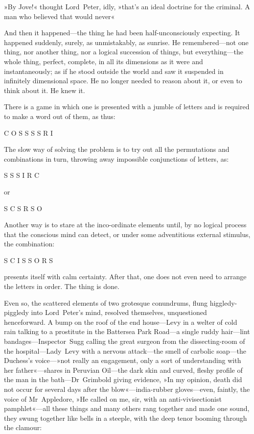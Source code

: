 »By Jove!« thought Lord~Peter, idly, »that's an ideal doctrine for the criminal. A man who believed that would never\longdash«

And then it happened—the thing he had been half-unconsciously expecting. It happened suddenly, surely, as unmistakably, as sunrise. He remembered—not one thing, nor another thing, nor a logical succession of things, but everything—the whole thing, perfect, complete, in all its dimensions as it were and instantaneously; as if he stood outside the world and saw it suspended in infinitely dimensional space. He no longer needed to reason about it, or even to think about it. He knew it.

There is a game in which one is presented with a jumble of letters and is required to make a word out of them, as thus:

\begin{center}
\textsc{C O S S S S R I}
\end{center}

The slow way of solving the problem is to try out all the permutations and combinations in turn, throwing away impossible conjunctions of letters, as:

\begin{center}
\textsc{S S S I R C}
\end{center}

or

\begin{center}
\textsc{S C S R S O}
\end{center}

Another way is to stare at the inco-ordinate elements until, by no logical process that the conscious mind can detect, or under some adventitious external stimulus, the combination:

\begin{center}
\textsc{S C I S S O R S}
\end{center}

presents itself with calm certainty. After that, one does not even need to arrange the letters in order. The thing is done.

Even so, the scattered elements of two grotesque conundrums, flung higgledy-piggledy into Lord~Peter's mind, resolved themselves, unquestioned henceforward. A bump on the roof of the end house—Levy in a welter of cold rain talking to a prostitute in the Battersea Park Road—a single ruddy hair—lint bandages—Inspector~Sugg calling the great surgeon from the dissecting-room of the hospital—Lady~Levy with a nervous attack—the smell of carbolic soap—the Duchess's voice---»not really an engagement, only a sort of understanding with her father«---shares in Peruvian Oil—the dark skin and curved, fleshy profile of the man in the bath—Dr~Grimbold giving evidence, »In my opinion, death did not occur for several days after the blow«---india-rubber gloves—even, faintly, the voice of Mr~Appledore, »He called on me, sir, with an anti-vivisectionist pamphlet«---all these things and many others rang together and made one sound, they swung together like bells in a steeple, with the deep tenor booming through the clamour:

